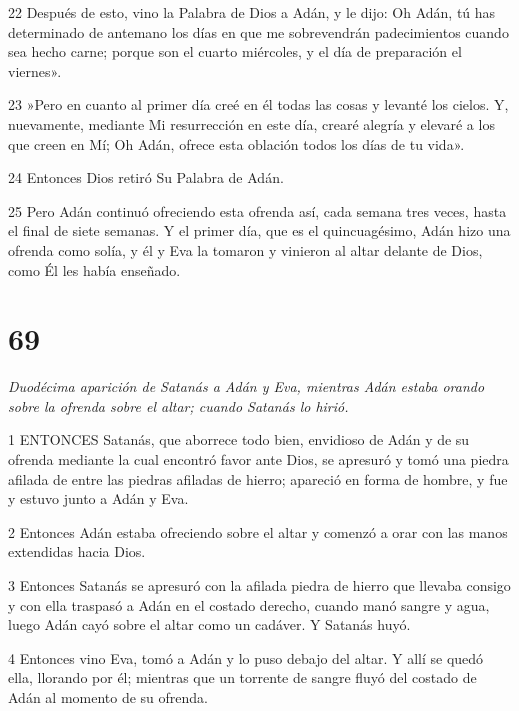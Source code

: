 \par 22 Después de esto, vino la Palabra de Dios a Adán, y le dijo: Oh Adán, tú has determinado de antemano los días en que me sobrevendrán padecimientos cuando sea hecho carne; porque son el cuarto miércoles, y el día de preparación el viernes».

\par 23 »Pero en cuanto al primer día creé en él todas las cosas y levanté los cielos. Y, nuevamente, mediante Mi resurrección en este día, crearé alegría y elevaré a los que creen en Mí; Oh Adán, ofrece esta oblación todos los días de tu vida».

\par 24 Entonces Dios retiró Su Palabra de Adán.

\par 25 Pero Adán continuó ofreciendo esta ofrenda así, cada semana tres veces, hasta el final de siete semanas. Y el primer día, que es el quincuagésimo, Adán hizo una ofrenda como solía, y él y Eva la tomaron y vinieron al altar delante de Dios, como Él les había enseñado.



\chapter{69}

\par \textit{Duodécima aparición de Satanás a Adán y Eva, mientras Adán estaba orando sobre la ofrenda sobre el altar; cuando Satanás lo hirió.}

\par 1 ENTONCES Satanás, que aborrece todo bien, envidioso de Adán y de su ofrenda mediante la cual encontró favor ante Dios, se apresuró y tomó una piedra afilada de entre las piedras afiladas de hierro; apareció en forma de hombre, y fue y estuvo junto a Adán y Eva.

\par 2 Entonces Adán estaba ofreciendo sobre el altar y comenzó a orar con las manos extendidas hacia Dios.

\par 3 Entonces Satanás se apresuró con la afilada piedra de hierro que llevaba consigo y con ella traspasó a Adán en el costado derecho, cuando manó sangre y agua, luego Adán cayó sobre el altar como un cadáver. Y Satanás huyó.

\par 4 Entonces vino Eva, tomó a Adán y lo puso debajo del altar. Y allí se quedó ella, llorando por él; mientras que un torrente de sangre fluyó del costado de Adán al momento de su ofrenda.

